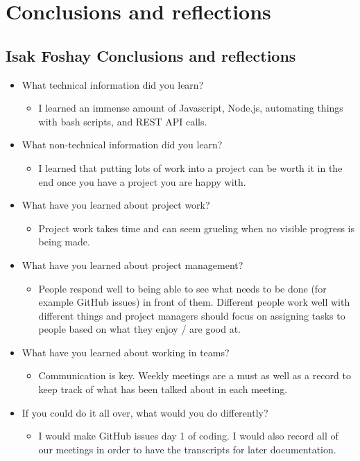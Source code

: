 \documentclass[draftclsnofoot,10pt,onecolumn]{IEEEtran}
\begin{document}
\clearpage
\section{Conclusions and reflections}
\subsection{Isak Foshay Conclusions and reflections}
\begin{itemize}
    \item What technical information did you learn?
    \begin{itemize}
        \item I learned an immense amount of Javascript, Node.js, automating things with bash scripts, and REST API calls.
    \end{itemize}
    \item What non-technical information did you learn?
    \begin{itemize}
        \item I learned that putting lots of work into a project can be worth it in the end once you have a project you are happy with.
    \end{itemize}
    \item What have you learned about project work?
    \begin{itemize}
        \item Project work takes time and can seem grueling when no visible progress is being made.
    \end{itemize}
    \item What have you learned about project management?
    \begin{itemize}
        \item People respond well to being able to see what needs to be done (for example GitHub issues) in front of them. Different people work well with different things and project managers should focus on assigning tasks to people based on what they enjoy / are good at.
    \end{itemize}
    \item What have you learned about working in teams?
    \begin{itemize}
        \item Communication is key. Weekly meetings are a must as well as a record to keep track of what has been talked about in each meeting.
    \end{itemize}
    \item If you could do it all over, what would you do differently?
    \begin{itemize}
        \item I would make GitHub issues day 1 of coding. I would also record all of our meetings in order to have the transcripts for later documentation.
    \end{itemize}
\end{itemize}
\end{document}
